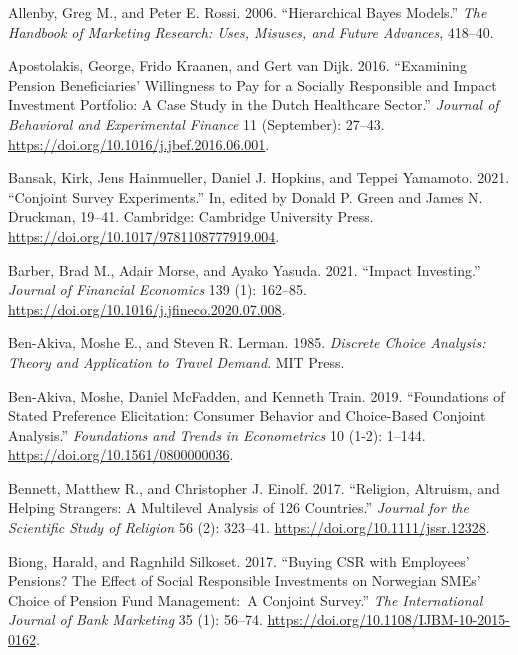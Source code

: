 \documentclass[
  12pt,
]{article}
\newlength{\cslhangindent}
\newlength{\cslentryspacingunit} %
\newenvironment{CSLReferences}[2] %
 {%
  \setlength{\parindent}{0pt}
  \ifodd #1
  \let\oldpar\par
  \def\par{\hangindent=\cslhangindent\oldpar}
  \fi
  \setlength{\parskip}{#2\cslentryspacingunit}
 }%
 {}
\begin{document}
\hypertarget{refs}{}
\begin{CSLReferences}{1}{0}
\leavevmode{}%
Allenby, Greg M., and Peter E. Rossi. 2006. {``Hierarchical Bayes Models.''} \emph{The Handbook of Marketing Research: Uses, Misuses, and Future Advances}, 418--40.

\leavevmode{}%
Apostolakis, George, Frido Kraanen, and Gert van Dijk. 2016. {``Examining Pension Beneficiaries{'} Willingness to Pay for a Socially Responsible and Impact Investment Portfolio: A Case Study in the Dutch Healthcare Sector.''} \emph{Journal of Behavioral and Experimental Finance} 11 (September): 27--43. \url{https://doi.org/10.1016/j.jbef.2016.06.001}.

\leavevmode{}%
Bansak, Kirk, Jens Hainmueller, Daniel J. Hopkins, and Teppei Yamamoto. 2021. {``Conjoint Survey Experiments.''} In, edited by Donald P. Green and James N. Druckman, 19--41. Cambridge: Cambridge University Press. \url{https://doi.org/10.1017/9781108777919.004}.

\leavevmode{}%
Barber, Brad M., Adair Morse, and Ayako Yasuda. 2021. {``Impact Investing.''} \emph{Journal of Financial Economics} 139 (1): 162--85. \url{https://doi.org/10.1016/j.jfineco.2020.07.008}.

\leavevmode{}%
Ben-Akiva, Moshe E., and Steven R. Lerman. 1985. \emph{Discrete Choice Analysis: Theory and Application to Travel Demand}. MIT Press.

\leavevmode{}%
Ben-Akiva, Moshe, Daniel McFadden, and Kenneth Train. 2019. {``Foundations of Stated Preference Elicitation: Consumer Behavior and Choice-Based Conjoint Analysis.''} \emph{Foundations and Trends in Econometrics} 10 (1-2): 1--144. \url{https://doi.org/10.1561/0800000036}.

\leavevmode{}%
Bennett, Matthew R., and Christopher J. Einolf. 2017. {``Religion, Altruism, and Helping Strangers: A Multilevel Analysis of 126 Countries.''} \emph{Journal for the Scientific Study of Religion} 56 (2): 323--41. \url{https://doi.org/10.1111/jssr.12328}.

\leavevmode{}%
Biong, Harald, and Ragnhild Silkoset. 2017. {``Buying CSR with Employees' Pensions? The Effect of Social Responsible Investments on Norwegian SMEs' Choice of Pension Fund Management:~A Conjoint Survey.''} \emph{The International Journal of Bank Marketing} 35 (1): 56--74. \url{https://doi.org/10.1108/IJBM-10-2015-0162}.


\end{CSLReferences}
\end{document}
